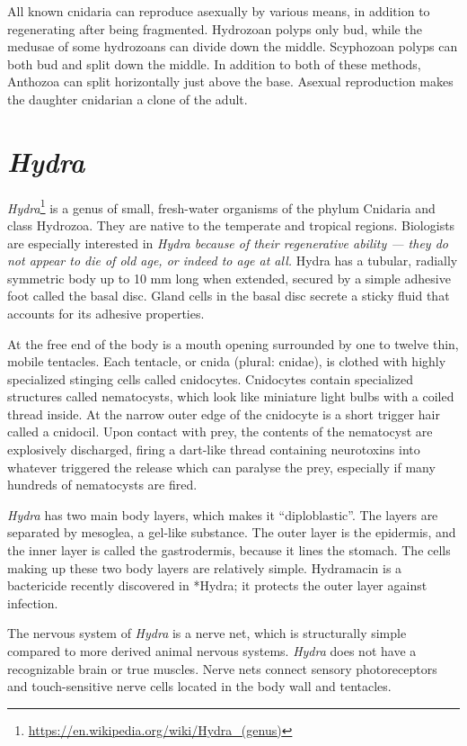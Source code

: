 \documentclass[]{book}
\let\rmarkdownfootnote\footnote%
\def\footnote{\protect\rmarkdownfootnote}
\renewcommand{\href}[2]{#2\footnote{\url{#1}}}
\theoremstyle{definition}
\theoremstyle{definition}
\theoremstyle{definition}
\theoremstyle{remark}
\begin{document}
All known cnidaria can reproduce asexually by various means, in addition
to regenerating after being fragmented. Hydrozoan polyps only bud, while
the medusae of some hydrozoans can divide down the middle. Scyphozoan
polyps can both bud and split down the middle. In addition to both of
these methods, Anthozoa can split horizontally just above the base.
Asexual reproduction makes the daughter cnidarian a clone of the adult.

\section{\texorpdfstring{\emph{Hydra}}{Hydra}}\label{hydra}

\href{https://en.wikipedia.org/wiki/Hydra_(genus)}{\emph{Hydra}} is a
genus of small, fresh-water organisms of the phylum Cnidaria and class
Hydrozoa. They are native to the temperate and tropical regions.
Biologists are especially interested in \emph{Hydra because of their
regenerative ability --- they do not appear to die of old age, or indeed
to age at all. }Hydra has a tubular, radially symmetric body up to 10 mm
long when extended, secured by a simple adhesive foot called the basal
disc. Gland cells in the basal disc secrete a sticky fluid that accounts
for its adhesive properties.

At the free end of the body is a mouth opening surrounded by one to
twelve thin, mobile tentacles. Each tentacle, or cnida (plural: cnidae),
is clothed with highly specialized stinging cells called cnidocytes.
Cnidocytes contain specialized structures called nematocysts, which look
like miniature light bulbs with a coiled thread inside. At the narrow
outer edge of the cnidocyte is a short trigger hair called a cnidocil.
Upon contact with prey, the contents of the nematocyst are explosively
discharged, firing a dart-like thread containing neurotoxins into
whatever triggered the release which can paralyse the prey, especially
if many hundreds of nematocysts are fired.

\emph{Hydra} has two main body layers, which makes it ``diploblastic''.
The layers are separated by mesoglea, a gel-like substance. The outer
layer is the epidermis, and the inner layer is called the gastrodermis,
because it lines the stomach. The cells making up these two body layers
are relatively simple. Hydramacin is a bactericide recently discovered
in *Hydra; it protects the outer layer against infection.

The nervous system of \emph{Hydra} is a nerve net, which is structurally
simple compared to more derived animal nervous systems. \emph{Hydra}
does not have a recognizable brain or true muscles. Nerve nets connect
sensory photoreceptors and touch-sensitive nerve cells located in the
body wall and tentacles.
\end{document}
